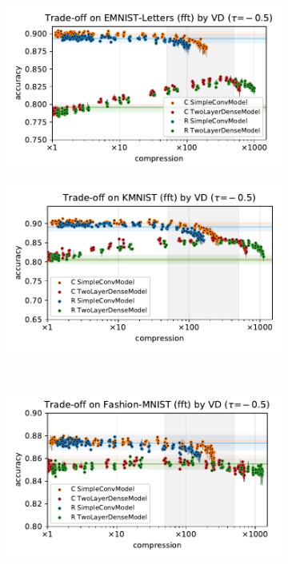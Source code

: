 \documentclass[a4paper,10pt,twocolumn]{article}
\begin{document}
\begin{figure}[b]
  \centering
  \begin{subfigure}[b]{0.5\columnwidth}
    \centering
    \includegraphics[width=\linewidth]{figure__mnist-like__trade-off/legacy__VD__emnist_letters__fft__-0.5.pdf}
  \end{subfigure}%
  \begin{subfigure}[b]{0.5\columnwidth}
    \centering
    \includegraphics[width=\linewidth]{figure__mnist-like__trade-off/legacy__VD__kmnist__fft__-0.5.pdf}
  \end{subfigure} \\%
  \begin{subfigure}[b]{0.5\columnwidth}
    \centering
    \includegraphics[width=\linewidth]{figure__mnist-like__trade-off/legacy__VD__fashionmnist__fft__-0.5.pdf}

\end{subfigure}
\end{figure}
\end{document}
